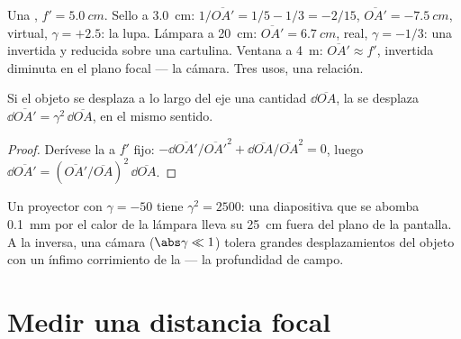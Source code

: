 \begin{example}\label{ex:b1:mirrors-thin-lenses:lensuses}
Una , $f' = \qty{5.0}{cm}$. Sello a \qty{3.0}{cm}:
$1/\overline{OA'} = 1/5 - 1/3 = -2/15$, $\overline{OA'} = \qty{-7.5}{cm}$,
virtual, $\gamma = +2.5$: la lupa. Lámpara a \qty{20}{cm}:
$\overline{OA'} = \qty{6.7}{cm}$, real, $\gamma = -1/3$: una 
invertida y reducida sobre una cartulina. Ventana a \qty{4}{m}: $\overline{OA'}
\approx f'$,  invertida diminuta en el plano focal --- la cámara.
Tres usos, una relación.
\end{example}

\begin{proposition}\label{prop:b1:mirrors-thin-lenses:longitudinal}
Si el objeto se desplaza a lo largo del eje una cantidad
$\dd\overline{OA}$, la  se desplaza
$\dd\overline{OA'} = \gamma^2\,\dd\overline{OA}$, en el mismo sentido.
\end{proposition}

\begin{proof}
Derívese la  a $f'$ fijo:
$-\dd\overline{OA'}/\overline{OA'}^2 + \dd\overline{OA}/\overline{OA}^2 = 0$,
luego $\dd\overline{OA'} = (\overline{OA'}/\overline{OA})^2\,\dd\overline{OA}$.
\end{proof}

\begin{remark}\label{rem:b1:mirrors-thin-lenses:depth}
Un proyector con $\gamma = -50$ tiene $\gamma^2 = 2500$: una diapositiva
que se abomba \qty{0.1}{mm} por el calor de la lámpara lleva su 
\qty{25}{cm} fuera del plano de la pantalla. A la inversa, una cámara ($\abs\gamma
\ll 1$) tolera grandes desplazamientos del objeto con un ínfimo corrimiento
de la  --- la profundidad de campo.
\end{remark}

\section{Medir una distancia focal}

